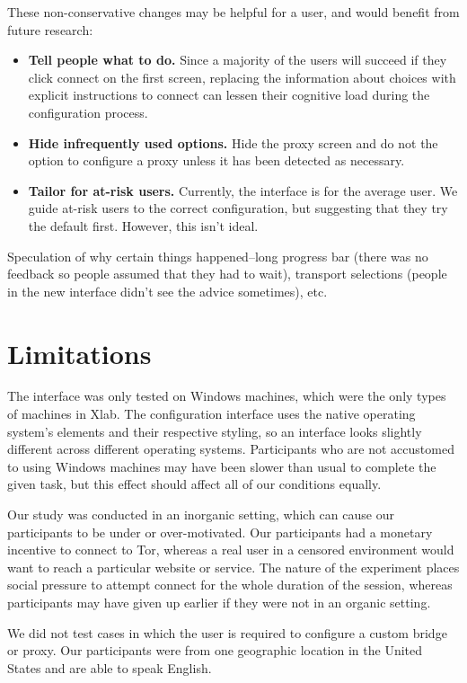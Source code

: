 \documentclass[USenglish,oneside,twocolumn]{article}
\begin{document}
These non-conservative changes may be helpful for a user, and would benefit from future research: \\

\begin{itemize}
\item {\bfseries Tell people what to do.} Since a majority of the users will succeed if they click connect on the first screen, replacing the information about choices with explicit instructions to connect can lessen their cognitive load during the configuration process. 
\item{\bfseries Hide infrequently used options.} Hide the proxy screen and do not the option to configure a proxy unless it has been detected as necessary.
\item{\bfseries Tailor for at-risk users.} Currently, the interface is for the average user. We guide at-risk users to the correct configuration, but suggesting that they try the default first. However, this isn't ideal. 
\end{itemize} 

{\color {red} Speculation of why certain things happened--long progress bar (there was no feedback so people assumed that they had to wait), transport selections (people in the new interface didn't see the advice sometimes), etc.} 

\section{Limitations} 
The interface was only tested on Windows machines, which were the only types of machines in Xlab. The configuration interface uses the native operating system's elements and their respective styling, so an interface looks slightly different across different operating systems. Participants who are not accustomed to using Windows machines may have been slower than usual to complete the given task, but this effect should affect all of our conditions equally. 

Our study was conducted in an inorganic setting, which can cause our participants to be under or over-motivated. Our participants had a monetary incentive to connect to Tor, whereas a real user in a censored environment would want to reach a particular website or service. The nature of the experiment places social pressure to attempt connect for the whole duration of the session, whereas participants may have given up earlier if they were not in an organic setting.   

We did not test cases in which the user is required to configure a custom bridge or proxy. Our participants were from one geographic location in the United States and are able to speak English.
\end{document}
